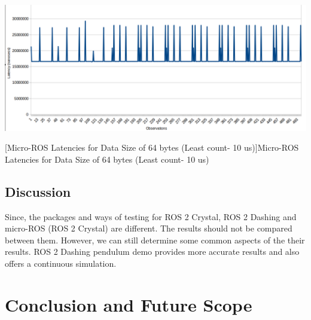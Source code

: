 \documentclass[%
xelatex,
	oneside,		%
	12pt,			%
	parskip=half,	%
	abstracton,
	chapterprefix=true%
    appendixprefix=true]
{scrbook}
\begin{document}
\begin{center}
\includegraphics[scale=0.32]{fig/uros64byte.png}

[Micro-ROS Latencies for Data Size of 64 bytes (Least count- 10 us)]{Micro-ROS Latencies for Data Size of 64 bytes (Least count- 10 us)}
\label{fig:uros64byte}
\end{center}

		\section{Discussion}
		\vspace*{0.5cm}
	Since, the packages and ways of testing for ROS 2 Crystal, ROS 2 Dashing and micro-ROS (ROS 2 Crystal) are different. The results should not be compared between them. However, we can still determine some common aspects of the their results.
	ROS 2 Dashing pendulum demo provides more accurate results and also offers a continuous simulation.  
		\chapter{Conclusion and Future Scope}
			
\rofoot[\pagemark]{\pagemark}
	\listoffigures
	\listoftables
		
		

\end{document}

